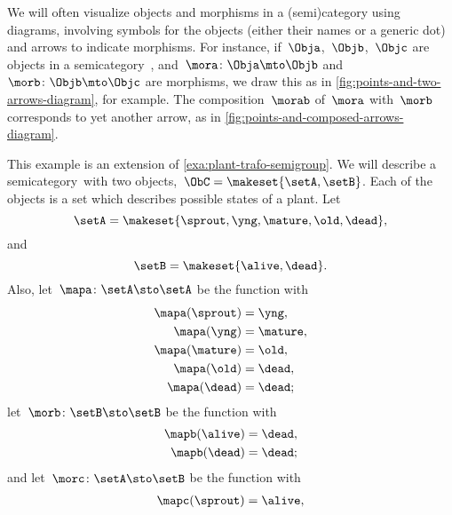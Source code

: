 We will often visualize objects and morphisms in a (semi)category using diagrams, involving symbols for the objects (either their names or a generic dot) and arrows to indicate morphisms.
For instance, if~$\Obja$,~$\Objb$,~$\Objc$ are objects in a semicategory~\CatC, and~$\mora\colon \Obja \mto \Objb$ and~$\morb\colon \Objb \mto \Objc$ are morphisms, we draw this as in \cref{fig:points-and-two-arrows-diagram}, for example.
The composition~$\morab$ of~$\mora$ with~$\morb$ corresponds to yet another arrow, as in \cref{fig:points-and-composed-arrows-diagram}.

\begin{example}
    \label{exa:semicat-plant-states}
    This example is an extension of \cref{exa:plant-trafo-semigroup}.
    We will describe a semicategory~\CatC with two objects,~$\ObC = \makeset{ \setA, \setB }$.
    Each of the objects is a set which describes possible states of a plant.
    Let
    \begin{equation}
        \setA = \makeset{ \sprout, \yng, \mature, \old, \dead },
    \end{equation}
    and
    \begin{equation}
        \setB = \makeset{ \alive, \dead }.
    \end{equation}
    Also, let~$\mapa \colon \setA \sto \setA$ be the function with
    \begin{equation}
        \begin{aligned}
            \mapa(\sprout) & =  \yng, \\
            \mapa(\yng)    & =  \mature, \\
            \mapa(\mature) & =  \old, \\
            \mapa( \old)   & = \dead, \\
            \mapa(\dead)   & = \dead;
        \end{aligned}
    \end{equation}
    let~$\morb \colon \setB \sto \setB$ be the function with
    \begin{equation}
        \begin{aligned}
            \mapb(\alive) & =  \dead, \\
            \mapb(\dead)  & =  \dead;
        \end{aligned}
    \end{equation}
    and let~$\morc \colon \setA \sto \setB$ be the function with
    \begin{equation}
        \begin{aligned}
            \mapc(\sprout) & = \alive, \\

\end{aligned}
\end{equation}
\end{example}
